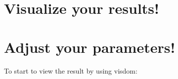 \documentclass[letterpaper,10pt,english]{sphinxmanual}
\begin{document}
\begin{fulllineitems}
\label{\detokenize{usage/train_file:train_unet.fill_image}}
\end{fulllineitems}


\begin{fulllineitems}
\label{\detokenize{usage/train_file:train_unet.main}}
\end{fulllineitems}


\begin{fulllineitems}
\label{\detokenize{usage/train_file:train_unet.preprocess}}
\end{fulllineitems}


\begin{fulllineitems}
\label{\detokenize{usage/train_file:train_unet.random}}\pysiglinewithargsret{\sphinxcode{\sphinxupquote{train\_unet.}}\sphinxbfcode{\sphinxupquote{random}}}{}{{ $\rightarrow$ x in the interval {[}0, 1).}}
\end{fulllineitems}



\section{Visualize your results!}
\label{\detokenize{usage/view:visualize-your-results}}\label{\detokenize{usage/view::doc}}

\section{Adjust your parameters!}
\label{\detokenize{usage/adjust:adjust-your-parameters}}\label{\detokenize{usage/adjust::doc}}
To start to view the result by using visdom:
\end{document}
